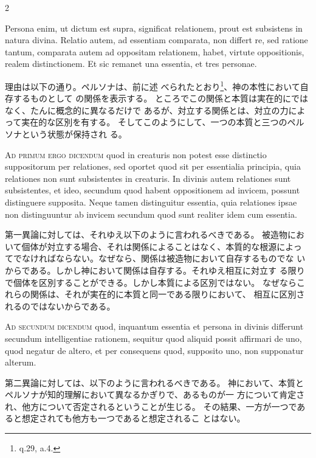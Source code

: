 \documentclass[paper=a4paper,fontsize=10pt,jafontsize=9pt,titlepage]{jlreq}
\begin{document}
\begin{paracol}{2}
\switchcolumn*

Persona enim, ut dictum est supra, significat relationem,
prout est subsistens in natura divina. Relatio autem, ad essentiam
comparata, non differt re, sed ratione tantum, comparata autem ad
oppositam relationem, habet, virtute oppositionis, realem
distinctionem. Et sic remanet una essentia, et tres personae.

\switchcolumn

理由は以下の通り。ペルソナは、前に述
 べられたとおり\footnote{q.29, a.4.}、神の本性において自存するものとして
 の関係を表示する。
ところでこの関係と本質は実在的にではなく、たんに概念的に異なるだけで
 あるが、対立する関係とは、対立の力によって実在的な区別を有する。
そしてこのようにして、一つの本質と三つのペルソナという状態が保持され
 る。

\switchcolumn*

{\scshape Ad primum ergo dicendum} quod in creaturis non potest esse distinctio
suppositorum per relationes, sed oportet quod sit per essentialia
principia, quia relationes non sunt subsistentes in creaturis. In
divinis autem relationes sunt subsistentes, et ideo, secundum quod
habent oppositionem ad invicem, possunt distinguere supposita. Neque
tamen distinguitur essentia, quia relationes ipsae non distinguuntur ab
invicem secundum quod sunt realiter idem cum essentia.

\switchcolumn

第一異論に対しては、それゆえ以下のように言われるべきである。
被造物において個体が対立する場合、それは関係によることはなく、本質的な根源によっ
 てでなければならない。なぜなら、関係は被造物において自存するものでな
 いからである。しかし神において関係は自存する。それゆえ相互に対立す
 る限りで個体を区別することができる。しかし本質による区別ではない。
 なぜならこれらの関係は、それが実在的に本質と同一である限りにおいて、
 相互に区別されるのではないからである。

\switchcolumn*

{\scshape Ad secundum dicendum} quod, inquantum essentia et persona in divinis
differunt secundum intelligentiae rationem, sequitur quod aliquid possit
affirmari de uno, quod negatur de altero, et per consequens quod,
supposito uno, non supponatur alterum.

\switchcolumn

第二異論に対しては、以下のように言われるべきである。
神において、本質とペルソナが知的理解において異なるかぎりで、あるものが一
 方について肯定され、他方について否定されるということが生じる。
その結果、一方が一つであると想定されても他方も一つであると想定されるこ
 とはない。


\end{paracol}
\end{document}
